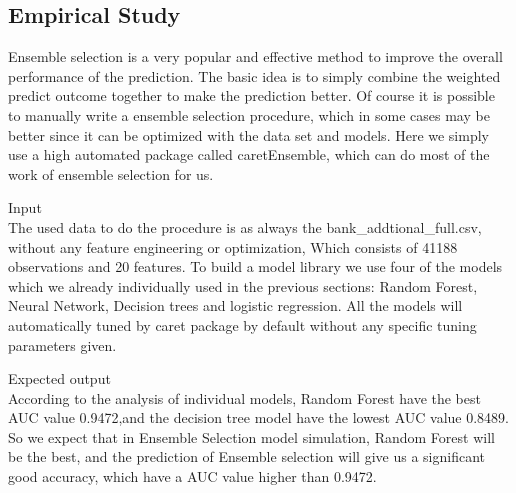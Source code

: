 \documentclass[12pt, a4paper, bibliography=totoc, english]{scrartcl}
\begin{document}
\subsection{Empirical Study}
Ensemble selection is a very popular and effective method to improve the overall performance of the prediction. The basic idea is to simply combine the weighted predict outcome together to make the prediction better. Of course it is possible to manually write a ensemble selection procedure, which in some cases may be better since it can be optimized with the data set and models. Here we simply use a high automated package called caretEnsemble, which can do most of the work of ensemble selection for us.\indent

\textbullet\quad Input\\
The used data to do the procedure is as always the bank\_addtional\_full.csv, without any feature engineering or optimization, Which consists of 41188 observations and 20 features. To build a model library we use four of the models which we already individually used in the previous sections: Random Forest, Neural Network, Decision trees and logistic regression. All the models will automatically tuned by caret package by default without any specific tuning parameters given.\indent

\textbullet\quad Expected output \\
According to the analysis of individual models, Random Forest have the best AUC value 0.9472,and the decision tree model have the lowest AUC value 0.8489. So we expect that in Ensemble Selection model simulation, Random Forest will be the best, and the prediction of Ensemble selection will give us a significant good accuracy, which have a AUC value higher than 0.9472.
\end{document}
